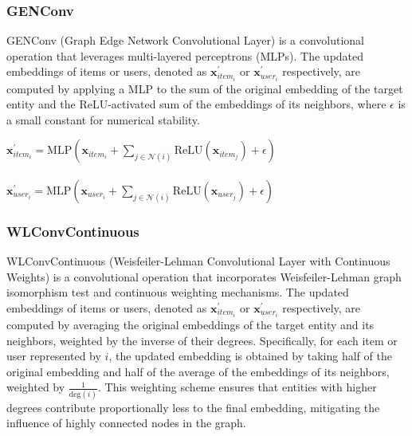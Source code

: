 \documentclass{scrartcl}
\begin{document}
\subsubsection{GENConv\cite{genconv}} 

\quad GENConv (Graph Edge Network Convolutional Layer) is a convolutional operation that leverages multi-layered perceptrons (MLPs). The updated embeddings of items or users, denoted as $\mathbf{x}^{\prime}_{item_i}$ or $\mathbf{x}^{\prime}_{user_i}$ respectively, are computed by applying a MLP to the sum of the original embedding of the target entity and the ReLU-activated sum of the embeddings of its neighbors, where $\epsilon$ is a small constant for numerical stability. \\ 

\begin{center}
    $\mathbf{x}_{item_{i}}^{\prime} = \mathrm{MLP} \left( \mathbf{x}_{item_{i}} +
    \sum_{j \in \mathcal{N}(i)} 
    \mathrm{ReLU} \left( \mathbf{x}_{item_{j}} \right) +\epsilon \right)$ \\~\\
    $\mathbf{x}_{user_{i}}^{\prime} = \mathrm{MLP} \left( \mathbf{x}_{user_{i}} +
    \sum_{j \in \mathcal{N}(i)} 
    \mathrm{ReLU} \left( \mathbf{x}_{user_{j}} \right) +\epsilon \right)$ 
\end{center}

\subsubsection{WLConvContinuous\cite{wlconvcontinuous}} 

\quad WLConvContinuous (Weisfeiler-Lehman Convolutional Layer with Continuous Weights) is a convolutional operation that incorporates Weisfeiler-Lehman graph isomorphism test and continuous weighting mechanisms. The updated embeddings of items or users, denoted as $\mathbf{x}^{\prime}_{item_i}$ or $\mathbf{x}^{\prime}_{user_i}$ respectively, are computed by averaging the original embeddings of the target entity and its neighbors, weighted by the inverse of their degrees. Specifically, for each item or user represented by $i$, the updated embedding is obtained by taking half of the original embedding and half of the average of the embeddings of its neighbors, weighted by $\frac{1}{\text{deg}(i)}$. This weighting scheme ensures that entities with higher degrees contribute proportionally less to the final embedding, mitigating the influence of highly connected nodes in the graph. \\ 
\end{document}
